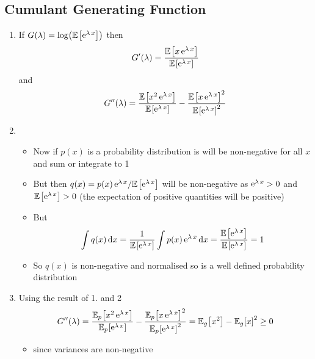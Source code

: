 \documentclass[11pt]{article}
\newcommand{\av}[2][]{\mathbb{E}_{#1\!}\left[ #2 \right]}
\newcommand{\logg}[1]{\log\!\left( #1 \right)}
\newcommand{\e}[1]{{\rm e}^{#1}}
\newcommand{\dd}{\mathrm{d}}
\begin{document}
\subsection{Cumulant Generating Function}
\label{sec:orgcbf8de7}
\begin{enumerate}
\item If \(G(\lambda) = \logg{\av{\e{\lambda\,x}}}\) then
$$ G'(\lambda) = \frac{ \av{x\,\e{\lambda\,x}} }{
      \av{\e{\lambda\,x}} } $$
and
$$ G''(\lambda) = \frac{ \av{x^2\,\e{\lambda\,x}} }{
      \av{\e{\lambda\,x}} } - \frac{ \av{x\,\e{\lambda\,x}}^2 }{
      \av{\e{\lambda\,x}}^2 } $$
\item \begin{itemize}
\item Now if \(p(x)\) is a probability distribution is will be
non-negative for all \(x\) and sum or integrate to 1
\item But then \(q(x) = p(x)\,\e{\lambda\,x}/\av{\e{\lambda\,x}}\)
will be non-negative as \(\e{\lambda\,x}>0\) and
\(\av{\e{\lambda\,x}}>0\) (the expectation of positive
quantities will be positive)
\item But
$$ \int q(x) \, \dd x = \frac{1}{\av{\e{\lambda\,x}}} \int
        p(x)\, \e{\lambda\,x}\,\dd x=
        \frac{\av{\e{\lambda\,x}}}{\av{\e{\lambda\,x}}} = 1 $$
\item So \(q(x)\) is non-negative and normalised so is a well defined
probability distribution
\end{itemize}
\item Using the result of 1. and 2
$$ G''(\lambda) = \frac{ \av[p]{x^2\,\e{\lambda\,x}} }{
      \av[p]{\e{\lambda\,x}} } - \frac{ \av[p]{x\,\e{\lambda\,x}}^2 }{
      \av[p]{\e{\lambda\,x}}^2 } = \av[g]{x^2} - \av[g]{x}^2 \geq 0 $$
\begin{itemize}
\item since variances are non-negative
\end{itemize}
\end{enumerate}
\end{document}
